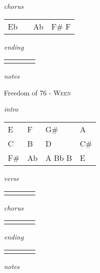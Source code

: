 \documentclass[12pt]{article}
\begin{document}
\textit{chorus}

\begin{tabular}{|P{1.25in}|P{1.25in}|P{1.25in}|P{1.25in}|}
   Eb &   &  Ab &  F# F \\
\end{tabular}

\textit{ending}

\begin{tabular}{|P{1.25in}|P{1.25in}|P{1.25in}|P{1.25in}|}
    &   &   &   \\
\end{tabular}

\textit{notes}

\newpage


{\Huge Freedom of 76} {\huge - \textsc{Ween}}

\huge
\textit{intro}

\begin{tabular}{|P{1.25in}|P{1.25in}|P{1.25in}|P{1.25in}|}
  E  & F  &  G# & A  \\
  C  &  B  &  D  & C# \\
  F# & Ab & A Bb B & E \\
\end{tabular}

\textit{verse}

\begin{tabular}{|P{1.25in}|P{1.25in}|P{1.25in}|P{1.25in}|}
    &   &   &   \\
\end{tabular}

\textit{chorus}

\begin{tabular}{|P{1.25in}|P{1.25in}|P{1.25in}|P{1.25in}|}
    &   &   &   \\
\end{tabular}

\textit{ending}

\begin{tabular}{|P{1.25in}|P{1.25in}|P{1.25in}|P{1.25in}|}
    &   &   &   \\
\end{tabular}

\textit{notes}

\newpage
\end{document}
